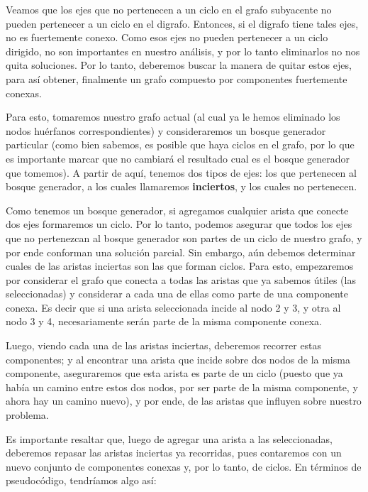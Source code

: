 Veamos que los ejes que no pertenecen a un ciclo en el grafo subyacente no pueden pertenecer a un ciclo en el digrafo. Entonces, si el digrafo tiene tales ejes, no es fuertemente conexo. Como esos ejes no pueden pertenecer a un ciclo dirigido, no son importantes en nuestro análisis, y por lo tanto eliminarlos no nos quita soluciones. Por lo tanto, deberemos buscar la manera de quitar estos ejes, para así obtener, finalmente un grafo compuesto por componentes fuertemente conexas.
\\
\par
Para esto, tomaremos nuestro grafo actual (al cual ya le hemos eliminado los nodos huérfanos correspondientes) y consideraremos un bosque generador particular (como bien sabemos, es posible que haya ciclos en el grafo, por lo que es importante marcar que no cambiará el resultado cual es el bosque generador que tomemos). A partir de aquí, tenemos dos tipos de ejes: los que pertenecen al bosque generador, a los cuales llamaremos \textbf{inciertos}, y los cuales no pertenecen.
\\
\par
Como tenemos un bosque generador, si agregamos cualquier arista que conecte dos ejes formaremos un ciclo. Por lo tanto, podemos asegurar que todos los ejes que no pertenezcan al bosque generador son partes de un ciclo de nuestro grafo, y por ende conforman una solución parcial. Sin embargo, aún debemos determinar cuales de las aristas inciertas son las que forman ciclos. Para esto, empezaremos por considerar el grafo que conecta a todas las aristas que ya sabemos útiles (las seleccionadas) y considerar a cada una de ellas como parte de una componente conexa. Es decir que si una arista seleccionada incide al nodo 2 y 3, y otra al nodo 3 y 4, necesariamente serán parte de la misma componente conexa.
\\
\par
Luego, viendo cada una de las aristas inciertas, deberemos recorrer estas componentes; y al encontrar una arista que incide sobre dos nodos de la misma componente, aseguraremos que esta arista es parte de un ciclo (puesto que ya había un camino entre estos dos nodos, por ser parte de la misma componente, y ahora hay un camino nuevo), y por ende, de las aristas que influyen sobre nuestro problema.
\\
\par
Es importante resaltar que, luego de agregar una arista a las seleccionadas, deberemos repasar las aristas inciertas ya recorridas, pues contaremos con un nuevo conjunto de componentes conexas y, por lo tanto, de ciclos. En términos de pseudocódigo, tendríamos algo así:

